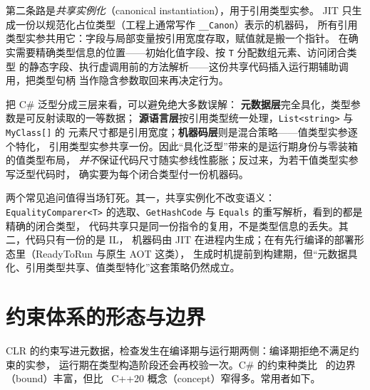 \documentclass[12pt,a4paper,fontset=fandol]{ctexbook}
\newcommand{\cpplabel}{%
  \tcbox[on line,colback=cppheadbg,colframe=cppheadbg,
    boxrule=0pt,arc=1pt,left=2pt,right=2pt,top=1pt,bottom=1pt,
    colupper=white,fontupper=\scriptsize\bfseries]{C++}}
\newcommand{\javalabel}{%
  \tcbox[on line,colback=javaheadbg,colframe=javaheadbg,
    boxrule=0pt,arc=1pt,left=2pt,right=2pt,top=1pt,bottom=1pt,
    colupper=white,fontupper=\scriptsize\bfseries]{Java}}
\newcommand{\cpp}[1]{C++#1}
\newcommand{\kw}[1]{\texttt{#1}}
\begin{document}
第二条路是\emph{共享实例化}（canonical instantiation），用于引用类型实参。
JIT 只生成一份以规范化占位类型（工程上通常写作 \kw{\_\_Canon}）表示的机器码，
所有引用类型实参共用它：字段与局部变量按引用宽度存取，赋值就是搬一个指针。
在确实需要精确类型信息的位置——初始化值字段、按 \kw{T} 分配数组元素、访问闭合类型
的静态字段、执行虚调用前的方法解析——这份共享代码插入运行期辅助调用，把类型句柄
当作隐含参数取回来再决定行为。

\begin{guideline}[title={具化不等于全部特化}]
把 C\# 泛型分成三层来看，可以避免绝大多数误解：
\textbf{元数据层}完全具化，类型参数是可反射读取的一等数据；
\textbf{源语言层}按引用类型统一处理，\kw{List<string>} 与 \kw{MyClass[]} 的
元素尺寸都是引用宽度；\textbf{机器码层}则是混合策略——值类型实参逐个特化，
引用类型实参共享一份。因此“具化泛型”带来的是运行期身份与零装箱的值类型布局，
\emph{并不}保证代码尺寸随实参线性膨胀；反过来，为若干值类型实参写泛型代码时，
确实要为每个闭合类型付一份机器码。
\end{guideline}

两个常见追问值得当场钉死。其一，共享实例化不改变语义：\kw{EqualityComparer<T>}
的选取、\kw{GetHashCode} 与 \kw{Equals} 的重写解析，看到的都是精确的闭合类型，
代码共享只是同一份指令的复用，不是类型信息的丢失。其二，代码只有一份的是 IL，
机器码由 JIT 在进程内生成；在有先行编译的部署形态里（ReadyToRun 与原生 AOT 这类），
生成时机提前到构建期，但“元数据具化、引用类型共享、值类型特化”这套策略仍然成立。

\section{约束体系的形态与边界}

CLR 的约束写进元数据，检查发生在编译期与运行期两侧：编译期拒绝不满足约束的实参，
运行期在类型构造阶段还会再校验一次。C\# 的约束种类比 \javalabel\ 的边界
（bound）丰富，但比 \cpplabel\ \cpp{20} 概念（concept）窄得多。常用者如下。
\end{document}

